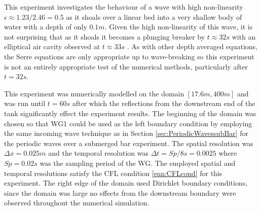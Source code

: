 This experiment investigates the behaviour of a wave with high non-linearity $ \epsilon \approx 1.23/2.46 = 0.5$ as it shoals over a linear bed into a very shallow body of water with a depth of only $0.1m$. Given the high non-linearity of this wave, it is not surprising that as it shoals it becomes a plunging breaker by $t \approx 32s$ with an elliptical air cavity observed at $t \approx 33s$ \cite{Roeber-2010}. As with other depth averaged equations, the Serre equations are only appropriate up to wave-breaking so this experiment is not an entirely appropriate test of the numerical methods, particularly after $t=32s$.

This experiment was numerically modelled on the domain $[17.6m , 400m]$ and was run until $t = 60s$ after which the reflections from the downstream end of the tank significantly effect the experiment results. The beginning of the domain was chosen so that WG1 could be used as the left boundary condition by employing the same incoming wave technique as in Section \ref{sec:PeriodicWavessubBar} for the periodic waves over a submerged bar experiment. The spatial resolution was $\Delta x = 0.025m$ and the temporal resolution was $\Delta t = Sp / 8 s = 0.0025$ where $Sp = 0.02s$ was the sampling period of the WG. The employed spatial and temporal resolutions satisfy the CFL condition \eqref{eqn:CFLcond} for this experiment. The right edge of the domain used Dirichlet boundary conditions, since the domain was large no effects from the downstream boundary were observed throughout the numerical simulation. 

